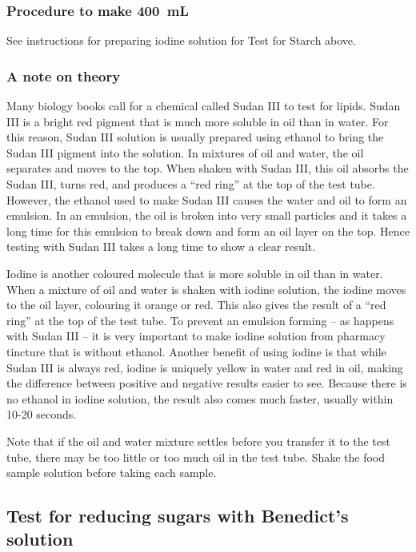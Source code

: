 \subsubsection{Procedure to make 400~mL}
See instructions for preparing iodine solution for Test for Starch above.

\subsubsection{A note on theory}

Many biology books call for a chemical called Sudan III to test for lipids. Sudan III is a bright red pigment that is much more soluble in oil than in water. For this reason, Sudan III solution is usually prepared using ethanol to bring the Sudan III pigment into the solution. In mixtures of oil and water, the oil separates and moves to the top. When shaken with Sudan III, this oil absorbs the Sudan III, turns red, and produces a ``red ring'' at the top of the test tube. However, the ethanol used to make Sudan III causes the water and oil to form an emulsion. In an emulsion, the oil is broken into very small particles and it takes a long time for this emulsion to break down and form an oil layer on the top. Hence testing with Sudan III takes a long time to show a clear result.

Iodine is another coloured molecule that is more soluble in oil than in water. When a mixture of oil and water is shaken with iodine solution, the iodine moves to the oil layer, colouring it orange or red. This also gives the result of a ``red ring'' at the top of the test tube. To prevent an emulsion forming -- as happens with Sudan III -- it is very important to make iodine solution from pharmacy tincture that is without ethanol. Another benefit of using iodine is that while Sudan III is always red, iodine is uniquely yellow in water and red in oil, making the difference between positive and negative results easier to see. Because there is no ethanol in iodine solution, the result also comes much faster, usually within 10-20 seconds.

Note that if the oil and water mixture settles before you transfer it to the test tube, there may be too little or too much oil in the test tube. Shake the food sample solution before taking each sample.

\subsection{Test for reducing sugars with Benedict's solution}

